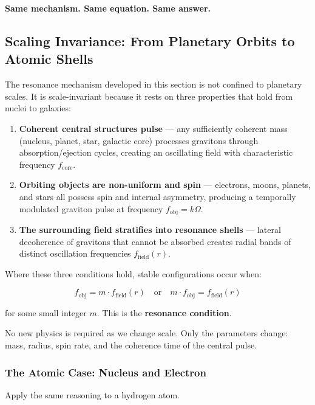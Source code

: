\documentclass[12pt, a4paper]{article}
\begin{document}
\textbf{Same mechanism. Same equation. Same answer.}
\subsection{Scaling Invariance: From Planetary Orbits to Atomic Shells}
\label{subsec:scaling_invariance}

The resonance mechanism developed in this section is not confined to planetary scales. It is scale-invariant because it rests on three properties that hold from nuclei to galaxies:

\begin{enumerate}
    \item \textbf{Coherent central structures pulse} — any sufficiently coherent mass (nucleus, planet, star, galactic core) processes gravitons through absorption/ejection cycles, creating an oscillating field with characteristic frequency \( f_{\text{core}} \).
    
    \item \textbf{Orbiting objects are non-uniform and spin} — electrons, moons, planets, and stars all possess spin and internal asymmetry, producing a temporally modulated graviton pulse at frequency \( f_{\text{obj}} = k\Omega \).
    
    \item \textbf{The surrounding field stratifies into resonance shells} — lateral decoherence of gravitons that cannot be absorbed creates radial bands of distinct oscillation frequencies \( f_{\text{field}}(r) \).
\end{enumerate}

Where these three conditions hold, stable configurations occur when:

\[
f_{\text{obj}} = m \cdot f_{\text{field}}(r) \quad \text{or} \quad m \cdot f_{\text{obj}} = f_{\text{field}}(r)
\]

for some small integer \( m \). This is the \textbf{resonance condition}.

No new physics is required as we change scale. Only the parameters change: mass, radius, spin rate, and the coherence time of the central pulse.

\subsubsection{The Atomic Case: Nucleus and Electron}
\label{subsec:atomic_case}

Apply the same reasoning to a hydrogen atom.
\end{document}
